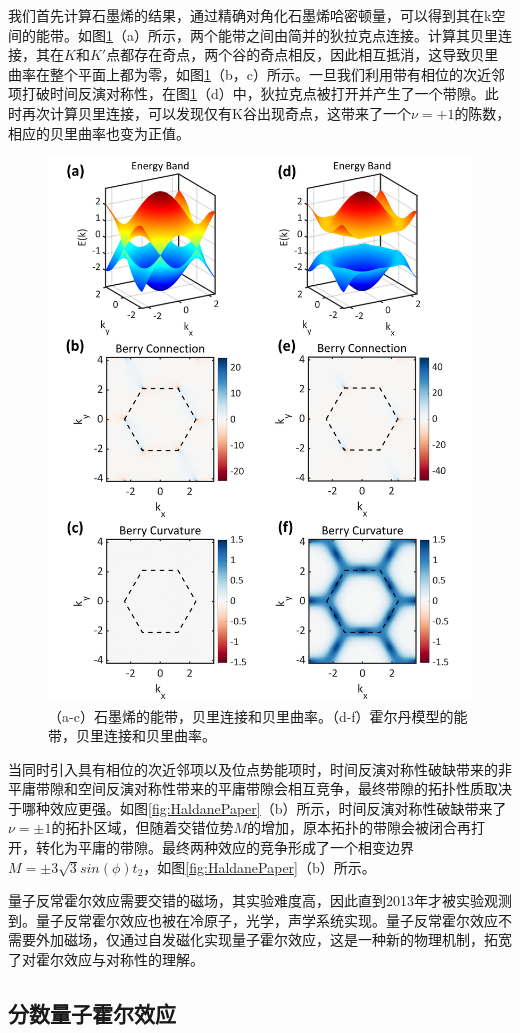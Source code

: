 我们首先计算石墨烯的结果，通过精确对角化石墨烯哈密顿量，可以得到其在k空间的能带。如图\ref{fig:HaldaneBand}（a）所示，两个能带之间由简并的狄拉克点连接。计算其贝里连接，其在$K$和$K'$点都存在奇点，两个谷的奇点相反，因此相互抵消，这导致贝里曲率在整个平面上都为零，如图\ref{fig:HaldaneBand}（b，c）所示。一旦我们利用带有相位的次近邻项打破时间反演对称性，在图\ref{fig:HaldaneBand}（d）中，狄拉克点被打开并产生了一个带隙。此时再次计算贝里连接，可以发现仅有K谷出现奇点，这带来了一个$\nu=+1$的陈数，相应的贝里曲率也变为正值。

\begin{figure}
    \centering
    \includegraphics[width=0.5\linewidth]{figure/Introduction/HaldaneBand.png}
    \caption{（a-c）石墨烯的能带，贝里连接和贝里曲率。（d-f）霍尔丹模型的能带，贝里连接和贝里曲率。}
    \label{fig:HaldaneBand}
\end{figure}

当同时引入具有相位的次近邻项以及位点势能项时，时间反演对称性破缺带来的非平庸带隙和空间反演对称性带来的平庸带隙会相互竞争，最终带隙的拓扑性质取决于哪种效应更强。如图\ref{fig:HaldanePaper}（b）所示，时间反演对称性破缺带来了$\nu=\pm1$的拓扑区域，但随着交错位势$M$的增加，原本拓扑的带隙会被闭合再打开，转化为平庸的带隙。最终两种效应的竞争形成了一个相变边界$M=\pm3\sqrt{3}sin(\phi)t_2$，如图\ref{fig:HaldanePaper}（b）所示。

量子反常霍尔效应需要交错的磁场，其实验难度高，因此直到2013年才被实验观测到\cite{chang2013experimental}。量子反常霍尔效应也被在冷原子\cite{jotzu2014experimental}，光学\cite{mittal2019photonic,liu2021gain}，声学\cite{li2018weyl}系统实现。量子反常霍尔效应不需要外加磁场，仅通过自发磁化实现量子霍尔效应，这是一种新的物理机制，拓宽了对霍尔效应与对称性的理解。

\subsection{分数量子霍尔效应}

